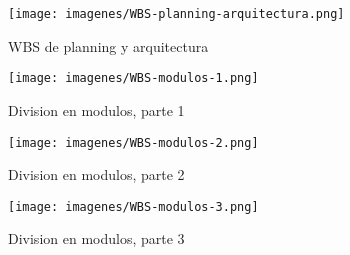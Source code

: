 \begin{figure}[h!]
   \texttt{[image: imagenes/WBS-planning-arquitectura.png]}
   \caption{WBS de planning y arquitectura}
\end{figure}

\newpage
\begin{landscape}

\begin{figure}[h!]
   \texttt{[image: imagenes/WBS-modulos-1.png]}
   \caption{Division en modulos, parte 1}
\end{figure}

\end{landscape}
\newpage

\newpage
\begin{landscape}

\begin{figure}[h!]
   \texttt{[image: imagenes/WBS-modulos-2.png]}
   \caption{Division en modulos, parte 2}
\end{figure}

\end{landscape}
\newpage

\newpage
\begin{landscape}

\begin{figure}[h!]
   \texttt{[image: imagenes/WBS-modulos-3.png]}
   \caption{Division en modulos, parte 3}
\end{figure}

\end{landscape}
\newpage



